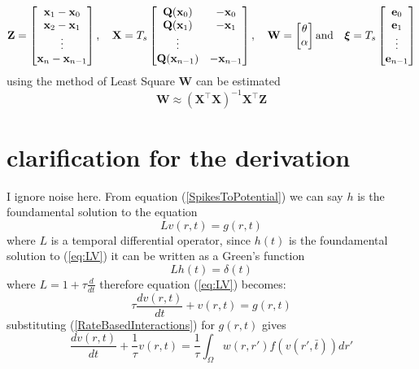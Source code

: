 \documentclass[onecolumn,draftcls]{IEEEtran}
\begin{document}
\begin{equation}
 \mathbf Z=\begin{bmatrix} \mathbf x_{1}-\mathbf x_{0}\\\mathbf x_{2}-\mathbf x_{1}\\\vdots\\\mathbf x_{n}-\mathbf x_{n-1}\end{bmatrix},\quad \mathbf X=T_s\begin{bmatrix}\mathbf Q(\mathbf x_0)&-\mathbf x_{0}\\\mathbf Q(\mathbf x_1)&-\mathbf x_{1}\\\vdots\\ \mathbf Q(\mathbf x_{n-1})&-\mathbf x_{n-1}\end{bmatrix},\quad \mathbf W=\begin{bmatrix}\mathbf \mathbf{\theta} \\ \alpha\end{bmatrix} \text{and}\quad \boldsymbol \xi=T_s\begin{bmatrix}\mathbf e_0\\\mathbf e_1\\\vdots\\\mathbf e_{n-1}\end{bmatrix}
\end{equation}
using the method of Least Square $ \mathbf W$ can be estimated
\begin{equation}
 \mathbf W\approx(\mathbf X^\top\mathbf X)^{-1}\mathbf X^\top\mathbf Z
\end{equation}
\section{clarification for the derivation} 
I ignore noise here. From equation (\ref{SpikesToPotential}) we can say $h$ is the foundamental solution to the equation
\begin{equation}
 Lv(r,t)=g(r,t)
\label{eq:LV}
\end{equation}
where $L$ is a temporal differential operator, since $h(t)$ is the foundamental solution to (\ref{eq:LV}) it can be written as a Green's function
\begin{equation}
 Lh(t)=\delta(t)
\end{equation}
where $L=1+\tau\frac{d}{dt}$ therefore equation (\ref{eq:LV}) becomes:
\begin{equation}
\tau\frac{dv(r,t)}{dt}+ v(r,t)=g(r,t)
\end{equation}
substituting (\ref{RateBasedInteractions}) for $g(r,t)$ gives
\begin{equation}
\frac{dv\left( {r,t} \right)}{dt} + \frac{1}{\tau} v\left( r,t \right) = \frac{1}{\tau}\int_\Omega  {w\left( r,r' \right)f\left( {v\left( r',\bar t \right)} \right)dr'} 
\end{equation}
\end{document}
